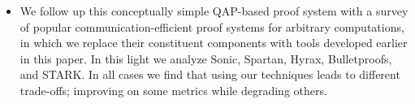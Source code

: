 \begin{itemize}
    \item[]  We follow up this conceptually simple QAP-based proof system with a survey of popular communication-efficient proof systems for arbitrary computations, in which we replace their constituent components with tools developed earlier in this paper. In this light we analyze Sonic, Spartan, Hyrax, Bulletproofs, and \textsf{STARK}. In all cases we find that using our techniques leads to different trade-offs; improving on some metrics while degrading others.
\end{itemize}
\fi 
